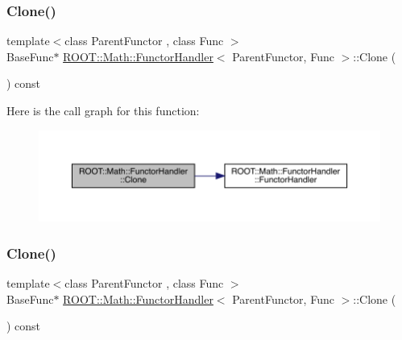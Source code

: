 \subsubsection{\texorpdfstring{Clone()}{Clone()}\hspace{0.1cm}{\footnotesize\ttfamily [1/3]}}
{\footnotesize\ttfamily template$<$class Parent\+Functor , class Func $>$ \\
Base\+Func$\ast$ \mbox{\hyperlink{classROOT_1_1Math_1_1FunctorHandler}{R\+O\+O\+T\+::\+Math\+::\+Functor\+Handler}}$<$ Parent\+Functor, Func $>$\+::Clone (\begin{DoxyParamCaption}{ }\end{DoxyParamCaption}) const\hspace{0.3cm}{\ttfamily [inline]}}

Here is the call graph for this function\+:
\nopagebreak
\begin{figure}[H]
\begin{center}
\leavevmode
\includegraphics[width=350pt]{d8/d4b/classROOT_1_1Math_1_1FunctorHandler_ad20fb7defe76e6abc244eff203aabbc6_cgraph}
\end{center}
\end{figure}
\mbox{\label{classROOT_1_1Math_1_1FunctorHandler_ad20fb7defe76e6abc244eff203aabbc6}} 
\subsubsection{\texorpdfstring{Clone()}{Clone()}\hspace{0.1cm}{\footnotesize\ttfamily [2/3]}}
{\footnotesize\ttfamily template$<$class Parent\+Functor , class Func $>$ \\
Base\+Func$\ast$ \mbox{\hyperlink{classROOT_1_1Math_1_1FunctorHandler}{R\+O\+O\+T\+::\+Math\+::\+Functor\+Handler}}$<$ Parent\+Functor, Func $>$\+::Clone (\begin{DoxyParamCaption}{ }\end{DoxyParamCaption}) const\hspace{0.3cm}{\ttfamily [inline]}}

